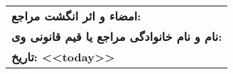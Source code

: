 \documentclass[12pt]{article}
\begin{document}
\vspace{3cm}
\begin{tabularx}{\textwidth}{X}

  \textbf{امضاء و اثر انگشت مراجع:} \\
  \textbf{نام و نام خانوادگی مراجع یا قیم قانونی وی: }\\
  \textbf{تاریخ: <<today>>}

\end{tabularx}
\end{document}
